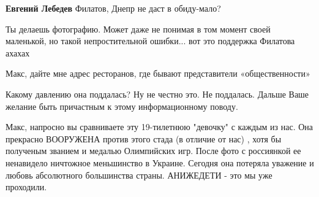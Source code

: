 \begin{itemize}
\begin{itemize}
 
\textbf{Евгений Лебедев} Филатов, Днепр не даст в обиду-мало?

 

Ты делаешь фотографию. Может даже не понимая в том момент своей маленькой, но
такой непростительной ошибки... вот это поддержка Филатова ахахах
\end{itemize}

 
Макс, дайте мне адрес ресторанов, где бывают представители «общественности» \Smiley[1.0][yellow]

 
Какому давлению она поддалась?
Ну не честно это.
Не поддалась.
Дальше Ваше желание быть причастным к этому информационному поводу.

 

Макс, напросно вы сравниваете эту 19-тилетнюю "девочку" с каждым из нас. Она
прекрасно ВООРУЖЕНА против этого стада (в отличие от нас) , хотя бы полученым
званием и медалью Олимпийских игр. После фото с россиянкой ее ненавидело
ничтожное меньшинство в Украине. Сегодня она потеряла уважение и любовь
абсолютного большинства страны. АНИЖЕДЕТИ - это мы уже проходили.


\end{itemize}
